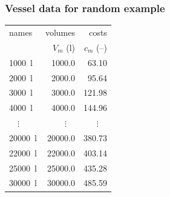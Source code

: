 \documentclass{beamer}
\begin{document}
\begin{frame}
    \frametitle{Vessel data for random example}
    \begin{table}
        \begin{tabular}{l | r | r}
            names & volumes & costs\\
            & $V_{m}$ (l) & $c_{m}$ (--)\\\hline
            \SI{1000}{\litre} & \SI{1000.0}{} & \SI{63.10}{}\\
            \SI{2000}{\litre} & \SI{2000.0}{} & \SI{95.64}{}\\
            \SI{3000}{\litre} & \SI{3000.0}{} & \SI{121.98}{}\\
            \SI{4000}{\litre} & \SI{4000.0}{} & \SI{144.96}{}\\
            $\quad\vdots$ & $\vdots\quad$ & $\vdots\quad$\\
            \SI{20000}{\litre} & \SI{20000.0}{} & \SI{380.73}{}\\
            \SI{22000}{\litre} & \SI{22000.0}{} & \SI{403.14}{}\\
            \SI{25000}{\litre} & \SI{25000.0}{} & \SI{435.28}{}\\
            \SI{30000}{\litre} & \SI{30000.0}{} & \SI{485.59}{}\\
        \end{tabular}
    \end{table}
\end{frame}
\end{document}
